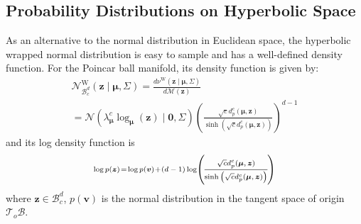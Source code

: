 \documentclass[letterpaper]{article} %
\begin{document}

\subsection{Probability Distributions on Hyperbolic Space}\label{section:4.1}
As an alternative to the normal distribution in Euclidean space, the hyperbolic wrapped normal distribution  \cite{nagano2019wrapped,mathieu2019continuous} is easy to sample and has a well-defined density function. For the Poincar ball manifold, its density function is given by: 
\begin{equation}
\begin{array}{l}
\mathcal{N}_{\mathcal{B}_{c}^{d}}^{\mathrm{W}}(\boldsymbol{z} \mid \boldsymbol{\mu}, \Sigma)=\frac{d \nu^{\mathrm{W}}(\boldsymbol{z} \mid \boldsymbol{\mu}, \Sigma)}{d \mathcal{M}(\boldsymbol{z})} \\
=\mathcal{N}\left(\lambda_{\boldsymbol{\mu}}^{c} \log _{\boldsymbol{\mu}}(\boldsymbol{z}) \mid \mathbf{0}, \Sigma\right)\left(\frac{\sqrt{c} d_{p}^{c}(\boldsymbol{\mu}, \boldsymbol{z})}{\sinh \left(\sqrt{c} d_{p}^{c}(\boldsymbol{\mu}, \boldsymbol{z})\right)}\right)^{d-1}
\end{array}
\end{equation}
and its log density function is
\begin{equation}\label{8}
\begin{scriptsize}
\log p(\boldsymbol{z})\!=\!\log p(\boldsymbol{v})\!+\!(d-1)\log\! \left(\!\frac{ \sqrt{c} d_{p}^{c}(\boldsymbol{\mu}, \boldsymbol{z})}{\sinh\left(\sqrt{c} d_{p}^{c}(\boldsymbol{\mu}, \boldsymbol{z})\right)}\!\right)
\end{scriptsize}
\end{equation}
where $\boldsymbol{z}\in \mathcal{B}_{c}^{d}$, 
$p(\boldsymbol{v})$ is the normal distribution in the tangent space of origin $\mathcal{T}_{o} \mathcal{B}$.
 
\end{document}
